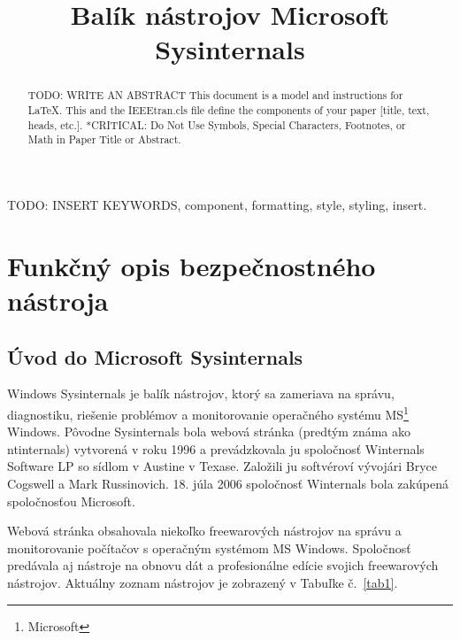 \documentclass[conference]{IEEEtran}
\begin{document}
\title{Balík nástrojov Microsoft Sysinternals}

\author{
}

\maketitle

\begin{abstract}
TODO: WRITE AN ABSTRACT
This document is a model and instructions for \LaTeX.
This and the IEEEtran.cls file define the components of your paper [title, text, heads, etc.]. *CRITICAL: Do Not Use Symbols, Special Characters, Footnotes, 
or Math in Paper Title or Abstract.
\end{abstract}

\begin{IEEEkeywords}
TODO: INSERT KEYWORDS, component, formatting, style, styling, insert.
\end{IEEEkeywords}


\nocite{*}

\section{Funkčný opis bezpečnostného nástroja}
\subsection{Úvod do Microsoft Sysinternals}

Windows Sysinternals je balík nástrojov, ktorý sa zameriava na správu, diagnostiku, riešenie problémov a monitorovanie operačného systému MS\footnote{Microsoft} Windows. Pôvodne Sysinternals bola webová stránka (predtým známa ako ntinternals) vytvorená v roku 1996 a prevádzkovala ju spoločnosť Winternals Software LP so sídlom v Austine v Texase. Založili ju softvéroví vývojári Bryce Cogswell a Mark Russinovich. 18. júla 2006 spoločnosť Winternals bola zakúpená spoločnosťou Microsoft.

Webová stránka obsahovala niekoľko freewarových nástrojov na správu a monitorovanie počítačov s operačným systémom MS Windows. Spoločnosť predávala aj nástroje na obnovu dát a profesionálne edície svojich freewarových nástrojov.
Aktuálny zoznam nástrojov je zobrazený v Tabuľke č.~\ref{tab1}.
\end{document}

